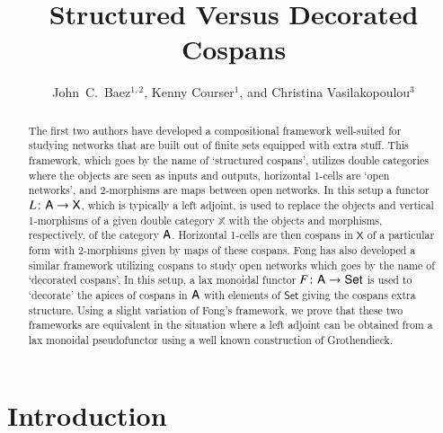 \documentclass[reqno]{amsart}
\title{Structured Versus Decorated Cospans}
\author{John\ C.\ Baez$^{1,2}$, Kenny Courser$^1$, and Christina Vasilakopoulou$^3$}
\begin{document}
\begin{abstract}
\noindent
The first two authors have developed a compositional framework well-suited for studying networks that are built out of finite sets equipped 
with extra stuff. This framework, which goes by the name of `structured cospans', utilizes double categories where the objects are seen as 
inputs and outputs, horizontal 1-cells are `open networks', and 2-morphisms are maps between open networks. In this setup a functor $L \colon 
\mathsf{A} \to \textsf{X}$, which is typically a left adjoint, is used to replace the objects and vertical 1-morphisms of a given double category 
$\mathbb{X}$ with the objects and morphisms, respectively, of the category $\mathsf{A}$. Horizontal 1-cells are then cospans in $\textsf{X}$ of a 
particular form with 2-morphisms given by maps of these cospans. Fong has also developed a similar framework utilizing cospans to study open 
networks which goes by the name of `decorated cospans'. In this setup, a lax monoidal functor $F \colon \mathsf{A} \to \textsf{Set}$ is used to 
`decorate' the apices of cospans in $\mathsf{A}$ with elements of $\textsf{Set}$ giving the cospans extra structure. Using a slight variation of 
Fong's framework, we prove that these two frameworks are equivalent in the situation where a left adjoint can be obtained from a lax 
monoidal pseudofunctor using a well known construction of Grothendieck.
\end{abstract}

\maketitle

\setcounter{tocdepth}{1}
\tableofcontents

\section{Introduction}
\end{document}
